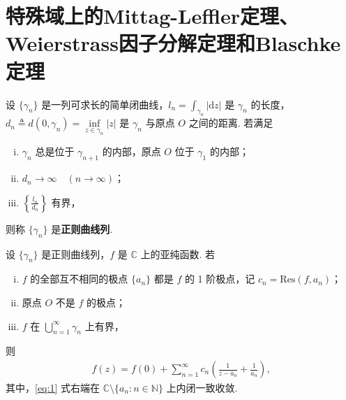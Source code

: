 \documentclass[../../main.tex]{subfiles}%
\begin{document}
\section{特殊域上的Mittag-Leffler定理、Weierstrass因子分解定理和Blaschke定理}

\begin{definition}
设 \(\{\gamma_n\}\) 是一列可求长的简单闭曲线，\(l_n = \int_{\gamma_n} |\mathrm{d}z|\) 是 \(\gamma_n\) 的长度，\(d_n \triangleq d(0, \gamma_n) = \inf\limits_{z \in \gamma_n} |z|\) 是 \(\gamma_n\) 与原点 \(O\) 之间的距离. 若满足
\begin{enumerate}[(i)]
\item \(\gamma_n\) 总是位于 \(\gamma_{n+1}\) 的内部，原点 \(O\) 位于 \(\gamma_1\) 的内部；
\item \(d_n \to \infty \quad (n \to \infty)\)；
\item \(\left\{ \frac{l_n}{d_n} \right\}\) 有界，
\end{enumerate}
则称 \(\{\gamma_n\}\) 是\textbf{正则曲线列}.
\end{definition}

\begin{theorem}\label{thm:meromorphic_expan}
设 \(\{\gamma_n\}\) 是正则曲线列，\(f\) 是 \(\mathbb{C}\) 上的亚纯函数. 若
\begin{enumerate}[(i)]
\item \(f\) 的全部互不相同的极点 \(\{a_n\}\) 都是 \(f\) 的 1 阶极点，记 \(c_n = \mathrm{Res}(f, a_n)\)；
\item 原点 \(O\) 不是 \(f\) 的极点；
\item \(f\) 在 \(\bigcup\limits_{n=1}^\infty \gamma_n\) 上有界，
\end{enumerate}
则
\begin{align} \label{eq:1}
f(z) = f(0) + \sum_{n=1}^\infty c_n \left( \frac{1}{z-a_n} + \frac{1}{a_n} \right),
\end{align}
其中，\eqref{eq:1} 式右端在 \(\mathbb{C} \setminus \{a_n : n \in \mathbb{N}\}\) 上内闭一致收敛.
\end{theorem}
\end{document}
